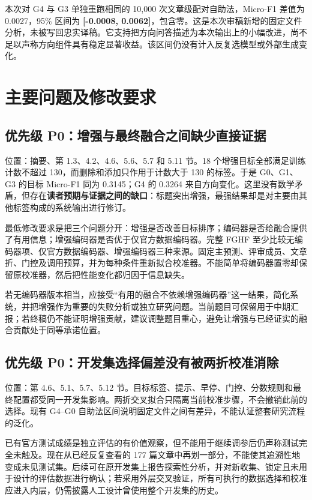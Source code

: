 \documentclass[12pt,a4paper]{article}
\begin{document}
本次对 G4 与 G3 单独重跑相同的 10,000 次文章级配对自助法，Micro-F1 差值为 0.0027，95\% 区间为 \textbf{[-0.0008, 0.0062]}，包含零。这是本次审稿新增的固定文件分析，未被写回忠实译稿。它支持把方向问答描述为本次输出上的小幅改进，尚不足以声称方向组件具有稳定显著收益。该区间仍没有计入反复选模型或外部生成变化。

\section{主要问题及修改要求}
\subsection{优先级 P0：增强与最终融合之间缺少直接证据}
位置：摘要、第 1.3、4.2、4.6、5.6、5.7 和 5.11 节。18 个增强目标全部满足训练计数不超过 130，而删除和添加只作用于计数大于 130 的标签。于是 G0、G1、G3 的目标 Micro-F1 同为 0.3145；G4 的 0.3264 来自方向变化。这里没有数学矛盾，但存在\textbf{读者预期与证据之间的缺口}：标题突出增强，最强结果却是对主要由其他标签构成的系统输出进行修订。

最低修改要求是把三个问题分开：增强是否改善目标排序；编码器是否给融合提供了有用信息；增强编码器是否优于仅官方数据编码器。完整 FGHF 至少比较无编码器项、仅官方数据编码器、增强编码器三种来源。固定主预测、评审成员、文章折、门控及调用预算，并为每种条件重新拟合校准器。不能简单将编码器置零却保留原校准器，然后把性能变化都归因于信息缺失。

若无编码器版本相当，应接受“有用的融合不依赖增强编码器”这一结果，简化系统，并把增强作为重要的失败分析或独立研究问题。当前题目可保留用于中期汇报；若终稿仍不能证明增强贡献，建议调整题目重心，避免让增强与已经证实的融合贡献处于同等承诺位置。

\subsection{优先级 P0：开发集选择偏差没有被两折校准消除}
位置：第 4.6、5.1、5.7、5.12 节。目标标签、提示、早停、门控、分数规则和最终配置都受同一开发集影响。两折交叉拟合只隔离当前校准步骤，不会撤销此前的选择。现有 G4--G0 自助法区间说明固定文件之间有差异，不能认证整套研究流程的泛化。

已有官方测试成绩是独立评估的有价值观察，但不能用于继续调参后仍声称测试完全未触及。现在从已经反复查看的 177 篇文章中再划一部分，不能使其追溯性地变成未见测试集。后续可在原开发集上报告探索性分析，并对新收集、锁定且未用于设计的评估数据进行确认；若采用外层交叉验证，所有可执行的数据选择和校准应进入内层，仍需披露人工设计曾使用整个开发集的历史。
\end{document}
